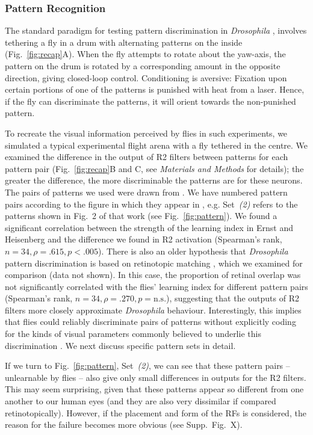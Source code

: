 \subsubsection{Pattern Recognition}
The standard paradigm for testing pattern discrimination in \emph{Drosophila} \cite{Pan2009,Liu2006,Ernst1999,Dill1993}, involves tethering a fly in a drum with alternating patterns on the inside (Fig.~\ref{fig:recap}A).
When the fly attempts to rotate about the yaw-axis, the pattern on the drum is rotated by a corresponding amount in the opposite direction, giving closed-loop control.
Conditioning is aversive: Fixation upon certain portions of one of the patterns is punished with heat from a laser.
Hence, if the fly can discriminate the patterns, it will orient towards the non-punished pattern.

To recreate the visual information perceived by flies in such experiments, we simulated a typical experimental flight arena with a fly tethered in the centre.
We examined the difference in the output of R2 filters between patterns for each pattern pair (Fig.~\ref{fig:recap}B and C, see \emph{Materials and Methods} for details); the greater the difference, the more discriminable the patterns are for these neurons.
The pairs of patterns we used were drawn from \cite{Ernst1999}.
We have numbered pattern pairs according to the figure in which they appear in \cite{Ernst1999}, e.g. Set~\emph{(2)} refers to the patterns shown in Fig.~2 of that work (see Fig.~\ref{fig:pattern}).
We found a significant correlation between the strength of the learning index in Ernst and Heisenberg \cite{Ernst1999} and the difference we found in R2 activation (Spearman's rank, $n=34, \rho=.615, p<.005$).
There is also an older hypothesis that \emph{Drosophila} pattern discrimination is based on retinotopic matching \cite{Dill1993}, which we examined for comparison (data not shown).
In this case, the proportion of retinal overlap was not significantly correlated with the flies' learning index for different pattern pairs (Spearman's rank, $n=34, \rho=.270, p=\mathrm{n.s.}$), suggesting that the outputs of R2 filters more closely approximate \emph{Drosophila} behaviour.
Interestingly, this implies that flies could reliably discriminate pairs of patterns without explicitly coding for the kinds of visual parameters commonly believed to underlie this discrimination \cite{Pan2009,Liu2006,Ernst1999}.
We next discuss specific pattern sets in detail.

If we turn to Fig.~\ref{fig:pattern}, Set~\emph{(2)}, we can see that these pattern pairs -- unlearnable by flies -- also give only small differences in outputs for the R2 filters.
This may seem surprising, given that these patterns appear so different from one another to our human eyes (and they are also very dissimilar if compared retinotopically).
However, if the placement and form of the RFs is considered, the reason for the failure becomes more obvious (see Supp.~Fig.~X).

